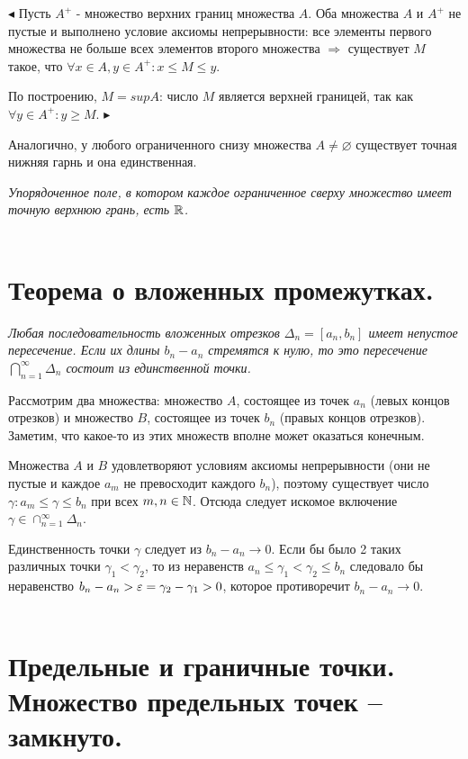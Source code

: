 $\blacktriangleleft$  Пусть $A^+$ - множество верхних границ множества $A$. Оба множества $A$ и $A^+$ не пустые и выполнено условие аксиомы непрерывности: все элементы первого множества не больше всех элементов второго множества $\Rightarrow$ существует $M$ такое, что $\forall x \in A, y \in A^+: x \leq M \leq y$.

По построению, $M = sup A$: число $M$ является верхней границей, так как $\forall y \in A^+: y \geq M$. $\blacktriangleright$

Аналогично, у любого ограниченного снизу множества $A \neq \varnothing$ существует точная нижняя гарнь и она единственная.
        
\textit{Упорядоченное поле, в котором каждое ограниченное сверху множество имеет точную верхнюю грань, есть $\mathbb{R}$.}
\\
\\



\section{Теорема о вложенных промежутках.}

\textit{Любая последовательность вложенных отрезков $\Delta_n = [a_n, b_n]$ имеет непустое пересечение. Если их длины $b_n - a_n$ стремятся к нулю, то это пересечение $\bigcap_{n=1}^\infty \Delta_n$ состоит из единственной точки.}

Рассмотрим два множества: множество $A$, состоящее из точек $a_n$ (левых концов отрезков) и множество $B$, состоящее из точек $b_n$ (правых концов отрезков). Заметим, что какое-то из этих множеств вполне может оказаться конечным.

Множества $A$ и $B$ удовлетворяют условиям аксиомы непрерывности (они не пустые и каждое $a_m$ не превосходит каждого $b_n$), поэтому существует число $\gamma \colon a_m \leq \gamma \leq b_n$ при всех $m,n \in \mathbb{N}$. Отсюда следует искомое включение $\gamma \in \cap_{n=1}^\infty \Delta_n$.

Единственность точки $\gamma$ следует из $b_n - a_n \rightarrow 0$. Если бы было 2 таких различных точки $\gamma_1 < \gamma_2$, то из неравенств $a_n \leqslant \gamma_1 < \gamma_2 \leqslant b_n$ следовало бы неравенство $b_n - a_n > \varepsilon = \gamma_2 - \gamma_1 > 0$, которое противоречит $b_n - a_n \rightarrow 0$.
\\
\\


\section{Предельные и граничные точки. Множество предельных точек -- замкнуто.}

